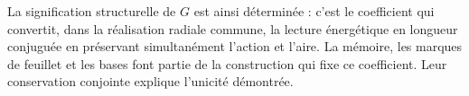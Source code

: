 La signification structurelle de $G$ est ainsi déterminée : c'est le coefficient qui convertit, dans la réalisation radiale commune, la lecture énergétique en longueur conjuguée en préservant simultanément l'action et l'aire. La mémoire, les marques de feuillet et les bases font partie de la construction qui fixe ce coefficient. Leur conservation conjointe explique l'unicité démontrée.
